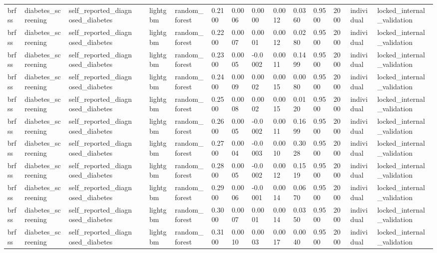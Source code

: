 \begin{tabular}{lllllllllllllll}
brfss & diabetes\_screening & self\_reported\_diagnosed\_diabetes &  & lightgbm & random\_forest & 0.2100 & 0.0006 & 0.0000 & 0.0012 & 0.0360 & 0.9500 & 2000 & individual & locked\_internal\_validation \\
brfss & diabetes\_screening & self\_reported\_diagnosed\_diabetes &  & lightgbm & random\_forest & 0.2200 & 0.0007 & 0.0001 & 0.0012 & 0.0280 & 0.9500 & 2000 & individual & locked\_internal\_validation \\
brfss & diabetes\_screening & self\_reported\_diagnosed\_diabetes &  & lightgbm & random\_forest & 0.2300 & 0.0005 & -0.0002 & 0.0011 & 0.1499 & 0.9500 & 2000 & individual & locked\_internal\_validation \\
brfss & diabetes\_screening & self\_reported\_diagnosed\_diabetes &  & lightgbm & random\_forest & 0.2400 & 0.0009 & 0.0002 & 0.0015 & 0.0080 & 0.9500 & 2000 & individual & locked\_internal\_validation \\
brfss & diabetes\_screening & self\_reported\_diagnosed\_diabetes &  & lightgbm & random\_forest & 0.2500 & 0.0008 & 0.0002 & 0.0015 & 0.0120 & 0.9500 & 2000 & individual & locked\_internal\_validation \\
brfss & diabetes\_screening & self\_reported\_diagnosed\_diabetes &  & lightgbm & random\_forest & 0.2600 & 0.0005 & -0.0002 & 0.0011 & 0.1699 & 0.9500 & 2000 & individual & locked\_internal\_validation \\
brfss & diabetes\_screening & self\_reported\_diagnosed\_diabetes &  & lightgbm & random\_forest & 0.2700 & 0.0004 & -0.0003 & 0.0010 & 0.3028 & 0.9500 & 2000 & individual & locked\_internal\_validation \\
brfss & diabetes\_screening & self\_reported\_diagnosed\_diabetes &  & lightgbm & random\_forest & 0.2800 & 0.0005 & -0.0002 & 0.0012 & 0.1519 & 0.9500 & 2000 & individual & locked\_internal\_validation \\
brfss & diabetes\_screening & self\_reported\_diagnosed\_diabetes &  & lightgbm & random\_forest & 0.2900 & 0.0006 & -0.0001 & 0.0014 & 0.0670 & 0.9500 & 2000 & individual & locked\_internal\_validation \\
brfss & diabetes\_screening & self\_reported\_diagnosed\_diabetes &  & lightgbm & random\_forest & 0.3000 & 0.0007 & 0.0001 & 0.0014 & 0.0350 & 0.9500 & 2000 & individual & locked\_internal\_validation \\
brfss & diabetes\_screening & self\_reported\_diagnosed\_diabetes &  & lightgbm & random\_forest & 0.3100 & 0.0010 & 0.0003 & 0.0017 & 0.0040 & 0.9500 & 2000 & individual & locked\_internal\_validation \\

\end{tabular}
